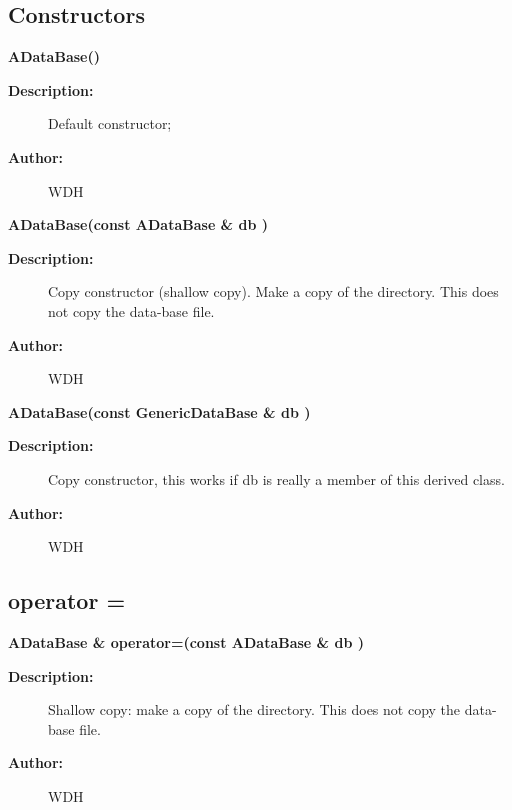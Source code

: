 \subsection{Constructors}
 
\newlength{\ADataBaseIncludeArgIndent}\begin{flushleft} \textbf{%
\settowidth{\ADataBaseIncludeArgIndent}{ADataBase(}%
ADataBase()
}\end{flushleft}
\begin{description}
\item[{\bf Description:}] 
   Default constructor;
\item[{\bf Author:}]  WDH

\end{description}

 
\begin{flushleft} \textbf{%
\settowidth{\ADataBaseIncludeArgIndent}{ADataBase(}%
ADataBase(const ADataBase \& db )
}\end{flushleft}
\begin{description}
\item[{\bf Description:}] 
   Copy constructor (shallow copy).
   Make a copy of the directory. This does not copy the data-base file.
\item[{\bf Author:}]  WDH

\end{description}

 
\begin{flushleft} \textbf{%
\settowidth{\ADataBaseIncludeArgIndent}{ADataBase(}%
ADataBase(const GenericDataBase \& db )
}\end{flushleft}
\begin{description}
\item[{\bf Description:}] 
   Copy constructor, this works if db is really a member of this derived class.
\item[{\bf Author:}]  WDH

\end{description}
\subsection{operator =}
 
\begin{flushleft} \textbf{%
\settowidth{\ADataBaseIncludeArgIndent}{ADataBase \& operator=(}%
ADataBase \& operator=(const ADataBase \& db )
}\end{flushleft}
\begin{description}
\item[{\bf Description:}] 
   Shallow copy: make a copy of the directory. This does not copy the data-base file.
\item[{\bf Author:}]  WDH

\end{description}
